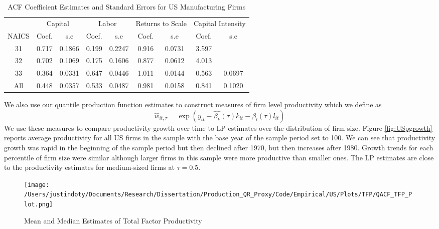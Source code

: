 \documentclass[11pt]{article}
\begin{document}
\begin{table}[H]
\centering
\caption{ACF Coefficient Estimates and Standard Errors for US Manufacturing Firms}
\begin{tabular}{ccccccccc}
  \hline\hline & \multicolumn{2}{c}{Capital} & \multicolumn{2}{c}{Labor} & \multicolumn{2}{c}{Returns to Scale} & \multicolumn{2}{c}{Capital Intensity}\\ \cmidrule(lr){2-3} \cmidrule(lr){4-5} \cmidrule(lr){6-7} \cmidrule(lr){8-9}NAICS & Coef. & s.e & Coef. & s.e & Coef. & s.e & Coef. & s.e \\ 
  \hline
31 & 0.717 & 0.1866 & 0.199 & 0.2247 & 0.916 & 0.0731 & 3.597 &  \\ 
  32 & 0.702 & 0.1069 & 0.175 & 0.1606 & 0.877 & 0.0612 & 4.013 &  \\ 
  33 & 0.364 & 0.0331 & 0.647 & 0.0446 & 1.011 & 0.0144 & 0.563 & 0.0697 \\ 
  All & 0.448 & 0.0357 & 0.533 & 0.0487 & 0.981 & 0.0158 & 0.841 & 0.1020 \\ 
   \hline
\end{tabular}
\label{USACFCoef}
\end{table}

We also use our quantile production function estimates to construct measures of firm level productivity which we define as
\begin{equation}
\hat{w}_{it,\tau}=\exp(y_{it}-\hat{\beta_{k}}(\tau)k_{it}-\hat{\beta_{l}}(\tau)l_{it})
\end{equation}
We use these measures to compare productivity growth over time to LP estimates over the distribution of firm size. Figure \ref{fig:USpgrowth} reports average productivity for all US firms in the sample with the base year of the sample period set to 100. We can see that productivity growth was rapid in the beginning of the sample period but then declined after 1970, but then increases after 1980. Growth trends for each percentile of firm size were similar although larger firms in this sample were more productive than smaller ones. The LP estimates are close to the productivity estimates for medium-sized firms at $\tau=0.5$.

\begin{figure}[H]
\centering
\caption{Mean and Median Estimates of Total Factor Productivity}
\texttt{[image: /Users/justindoty/Documents/Research/Dissertation/Production\_QR\_Proxy/Code/Empirical/US/Plots/TFP/QACF\_TFP\_Plot.png]}
\label{fig:ACFUSTFPDens}
\end{figure}
\end{document}
